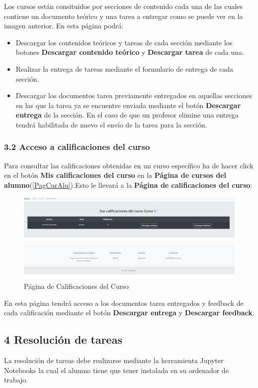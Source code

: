 Los cursos están consituidos por secciones de contenido cada una de las cuales contiene un documento teórico y una tarea a entregar como se puede ver en la imagen anterior. En esta página podrá:
\begin{itemize}
\tightlist
\item Descargar los contenidos teóricos y tareas de cada sección mediante los botones \textbf{Descargar contenido teórico} y \textbf{Descargar tarea} de cada una.
\item Realizar la entrega de tareas mediante el formulario de entrega de cada sección.
\item Descargar los documentos tarea previamente entregados en aquellas secciones en las que la tarea ya se encuentre enviada mediante el botón \textbf{Descargar entrega} de la sección. En el caso de que un profesor elimine una entrega tendrá habilitada de nuevo el envío de la tarea para la sección.
\end{itemize}


\subsubsection{3.2 Acceso a calificaciones del curso}
Para consultar las calificaciones obtenidas en un curso específico ha de hacer click en el botón \textbf{Mis calificaciones del curso} en la \textbf{Página de cursos del alumno}(\ref{PagCurAlu}).Esto le llevará a la \textbf{Página de calificaciones del curso}:

\begin{figure}[H]
\centering
\includegraphics[width=\textwidth]{img/imgs-memoria/CalificacionesCurso.PNG}
\caption{Página de Calificaciones del Curso}
\end{figure}

En esta página tendrá acceso a los documentos tarea entregados y feedback de cada calificación mediante el botón \textbf{Descargar entrega} y \textbf{Descargar feedback}.


\subsection{4 Resolución de tareas}
La resolución de tareas debe realizarse mediante la herramienta Jupyter Notebooks la cual el alumno tiene que tener instalada en su ordenador de trabajo.


